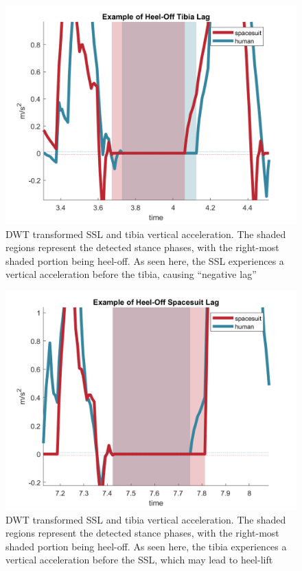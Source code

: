 \documentclass[defaultstyle,11pt]{comps}
\begin{document}
\begin{figure}
\hypertarget{fig:humanlag}{%
\centering
\includegraphics{../fig/SA1/humanlag.png}
\caption{DWT transformed SSL and tibia vertical acceleration. The shaded regions represent the detected stance phases, with the right-most shaded portion being heel-off. As seen here, the SSL experiences a vertical acceleration before the tibia, causing ``negative lag''}\label{fig:humanlag}
}
\end{figure}

\begin{figure}
\hypertarget{fig:sslag}{%
\centering
\includegraphics{../fig/SA1/sslag.png}
\caption{DWT transformed SSL and tibia vertical acceleration. The shaded regions represent the detected stance phases, with the right-most shaded portion being heel-off. As seen here, the tibia experiences a vertical acceleration before the SSL, which may lead to heel-lift}\label{fig:sslag}
}
\end{figure}
\end{document}
